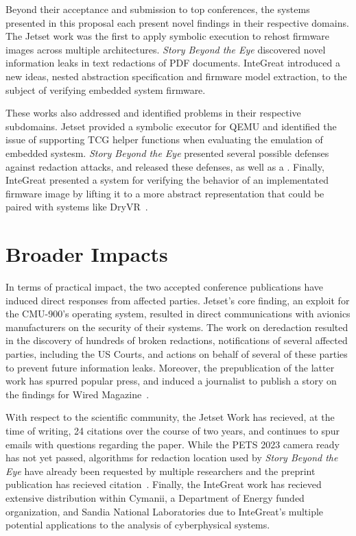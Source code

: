 Beyond their acceptance and submission to top conferences, the systems presented in this proposal each present novel findings in their respective domains. 
The Jetset work was the first to apply symbolic execution to rehost firmware images across multiple architectures.
\emph{Story Beyond the Eye} discovered novel information leaks in text redactions of PDF documents.
InteGreat introduced a new ideas, nested abstraction specification and firmware model extraction, to the subject of verifying embedded system firmware.

These works also addressed and identified problems in their respective subdomains.
Jetset provided a symbolic executor for QEMU and identified the issue of supporting TCG helper functions when evaluating the emulation of embedded systesm.
\emph{Story Beyond the Eye} presented several possible defenses against redaction attacks, and released these defenses, as well as a .
Finally, InteGreat presented a system for verifying the behavior of an implementated firmware image by lifting it to a more abstract representation that could be paired with systems like DryVR~\cite{fan2017dryvr}.


\section{Broader Impacts}

In terms of practical impact, the two accepted conference publications have induced direct responses from affected parties.
Jetset's core finding, an exploit for the CMU-900's operating system, resulted in direct communications with avionics manufacturers on the security of their systems.
The work on deredaction resulted in the discovery of hundreds of broken redactions, notifications of several affected parties, including the US Courts, and actions on behalf of several of these parties to prevent future information leaks. 
Moreover, the prepublication of the latter work has spurred popular press, and induced a journalist to publish a story on the findings for Wired Magazine~\cite{wiredredact}.

With respect to the scientific community, the Jetset Work has recieved, at the time of writing, 24 citations over the course of two years, and continues to spur emails with questions regarding the paper.
While the PETS 2023 camera ready has not yet passed, algorithms for redaction location used by \emph{Story Beyond the Eye} have already been requested by multiple researchers and the preprint publication has recieved citation~\cite{rust2022language}.
Finally, the InteGreat work has recieved extensive distribution within Cymanii, a Department of Energy funded organization, and Sandia National Laboratories due to InteGreat's multiple potential applications to the analysis of cyberphysical systems.
